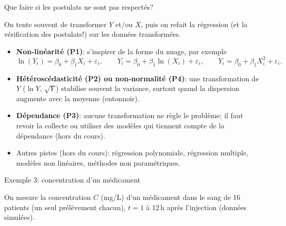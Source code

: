 \documentclass{BeamerTemplate}
\begin{document}
\begin{frame}[t]{Que faire si les postulats ne sont pas respectés?}

\small
On tente souvent de \alert{transformer} $Y$ et/ou $X$, puis on refait la
régression (et la vérification des postulats!) sur les données transformées.

\begin{itemize}\itemsep2mm
  \item<2-> \textbf{Non-linéarité (P1)}: s'inspirer de la forme du nuage, par
  exemple
  \[
  \ln(Y_i)=\beta_0+\beta_1X_i+\varepsilon_i,\qquad
  Y_i=\beta_0+\beta_1\ln(X_i)+\varepsilon_i,\qquad
  Y_i=\beta_0+\beta_1X_i^2+\varepsilon_i.
  \]
  \item<3-> \textbf{Hétéroscédasticité (P2) ou non-normalité (P4)}: une
  transformation de $Y$ ($\ln Y$, $\sqrt{Y}$) stabilise souvent la variance,
  surtout quand la dispersion augmente avec la moyenne (entonnoir).
  \item<4-> \textbf{Dépendance (P3)}: aucune transformation ne règle le problème;
  il faut revoir la collecte ou utiliser des modèles qui tiennent compte de la
  dépendance (hors du cours).
  \item<5-> Autres pistes (hors du cours): régression polynomiale, régression
  multiple, modèles non linéaires, méthodes non paramétriques.
\end{itemize}

\end{frame}

\begin{frame}[t]{Exemple 3: concentration d'un médicament}

On mesure la concentration $C$ (mg/L) d'un médicament dans le sang de 16 patients
(un seul prélèvement chacun), $t=1$ à 12\,h après l'injection (données simulées).

\centering
{}\hspace{3mm}

\raggedright
\small
{}

\end{frame}
\end{document}
